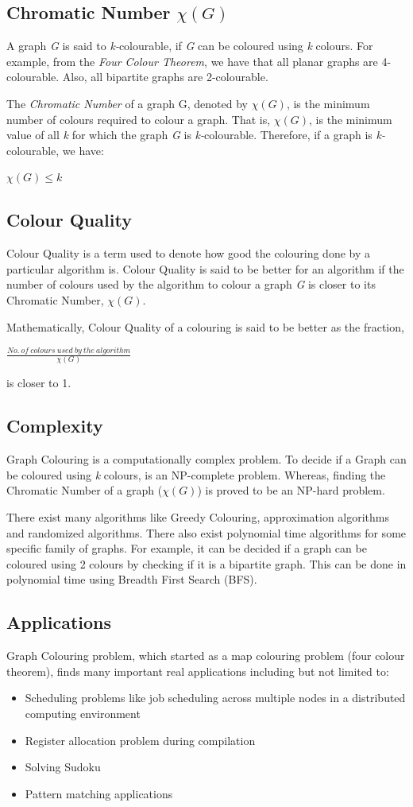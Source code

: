 \documentclass[MTech]{iitmdiss}
\begin{document}
\subsection{Chromatic Number $ \chi(G) $}
A graph \textit{G} is said to \textit{k-}colourable, if \textit{G} can be coloured using \textit{k} colours. For example, from the \textit{Four Colour Theorem}, we have that all planar graphs are 4-colourable. Also, all bipartite graphs are 2-colourable.
 
The \textit{Chromatic Number} of a graph G, denoted by $ \chi(G) $, is the minimum number of colours required to colour a graph. That is, $ \chi(G) $, is the minimum value of all \textit{k} for which the graph \textit{G} is \textit{k-}colourable. Therefore, if a graph is \textit{k-}colourable, we have:
\begin{center}
$ \chi(G) \leq k $
\end{center}
\subsection{Colour Quality}
Colour Quality is a term used to denote how good the colouring done by a particular algorithm is. Colour Quality is said to be better for an algorithm if the number of colours used by the algorithm to colour a graph \textit{G} is closer to its Chromatic Number, $\chi(G)$.

Mathematically, Colour Quality of a colouring is said to be better as the fraction,
\begin{center}
$\frac{No. \: of \: colours \: used \: by \: the \: algorithm}{\chi(G)} $
\end{center}
is closer to 1.
\subsection{Complexity}
Graph Colouring is a computationally complex problem. To decide if a Graph can be coloured using \textit{k} colours, is an NP-complete problem. Whereas, finding the Chromatic Number of a graph ($ \chi(G) $) is proved to be an NP-hard problem.

There exist many algorithms like Greedy Colouring, approximation algorithms and randomized algorithms. There also exist polynomial time algorithms for some specific family of graphs. For example, it can be decided if a graph can be coloured using 2 colours by checking if it is a bipartite graph. This can be done in polynomial time using Breadth First Search (BFS).
\subsection{Applications}
Graph Colouring problem, which started as a map colouring problem (four colour theorem), finds many important real applications including but not limited to:
\begin{itemize}
\item Scheduling problems like job scheduling across multiple nodes in a distributed computing environment
\item Register allocation problem during compilation
\item Solving Sudoku
\item Pattern matching applications
\end{itemize}
\end{document}
